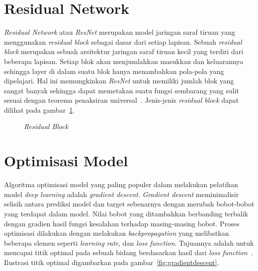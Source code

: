 \section{Residual Network}
\label{sec:2-ResidualNetwork}

\textit{Residual Network} atau \textit{ResNet} merupakan model jaringan saraf tiruan yang menggunakan \textit{residual block}
sebagai dasar dari setiap lapisan. Sebuah \textit{residual block} merupakan sebuah arsitektur jaringan
saraf tiruan kecil yang terdiri dari beberapa lapisan. Setiap blok akan menjumlahkan masukkan dan
keluarannya sehingga layer di dalam suatu blok hanya menambahkan pola-pola yang dipelajari. Hal ini
memungkinkan \textit{ResNet} untuk memiliki jumlah blok yang sangat banyak sehingga dapat memetakan
suatu fungsi sembarang yang sulit sesuai dengan teorema penaksiran universal~\cite{2015arXiv151203385H}.
Jenis-jenis \textit{residual block} dapat dilihat pada gambar~\ref{fig:resblock}.

\begin{figure}[htbp]
    \begin{center}
    \end{center}
    \vspace{-20pt}
    \captionsetup{labelfont=bf, textfont=bf}
    \caption{\textit{Residual Block}}
    \vspace{-10pt}
    \captionsetup{labelfont=md, textfont=md}
    \label{fig:resblock}
\end{figure}

\section{Optimisasi Model}
\label{sec:2-OptimisasiModel}

Algoritma optimisasi model yang paling populer dalam melakukan pelatihan model \textit{deep learning}
adalah \textit{gradient descent}. \textit{Gradient descent} meminimalisir selisih antara prediksi
model dan target sebenarnya dengan merubah bobot-bobot yang terdapat dalam model. Nilai bobot yang
ditambahkan berbanding terbalik dengan gradien hasil fungsi kesalahan terhadap masing-masing bobot.
Proses optimisasi dilakukan dengan melakukan \textit{backpropagation} yang
melibatkan beberapa elemen seperti \textit{learning rate},
dan \textit{loss function}. Tujuannya adalah untuk mencapai titik optimal pada sebuah bidang berdasarkan
hasil dari \textit{loss function}~\cite{2016arXiv160100013G}. Ilustrasi titik optimal digambarkan
pada gambar~\ref{fig:gradientdescent}.

